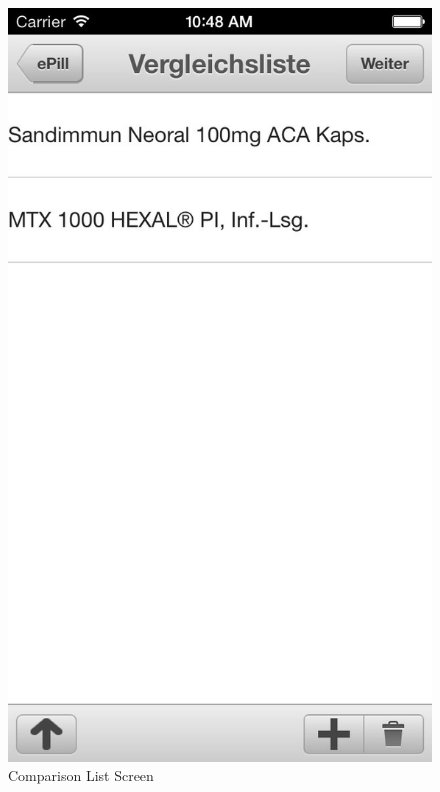 \begin{figure}[!b]
\begin{minipage}[b]{0.45\linewidth}
        \includegraphics[width=0.8025\linewidth]{figures/List_bw.jpg}
        \caption[Comparison List Screen]{Comparison List Screen}
        \label{fig:CurrentListScreen}
    \end{minipage}
    \hspace{0.5cm}
    \begin{minipage}[b]{0.45\linewidth}
        \centering

\end{minipage}
\end{figure}
